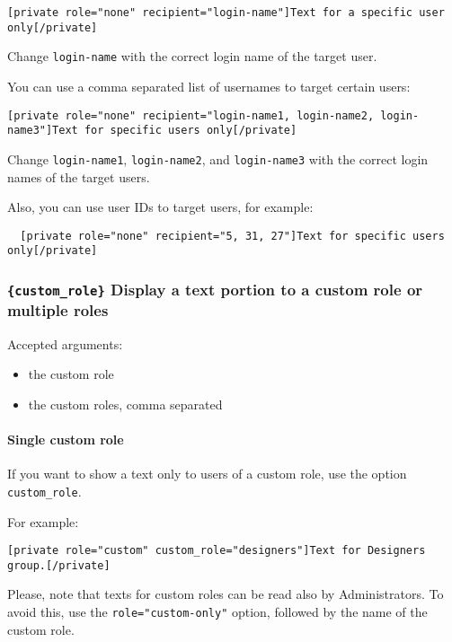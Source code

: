 \begin{lstlisting}
[private role="none" recipient="login-name"]Text for a specific user only[/private]
\end{lstlisting}

Change \verb+login-name+ with the correct login name of the target user.

You can use a comma separated list of usernames to target certain users:

\begin{lstlisting}
[private role="none" recipient="login-name1, login-name2, login-name3"]Text for specific users only[/private]
\end{lstlisting}

Change \verb+login-name1+, \verb+login-name2+, and \verb+login-name3+ with the
correct login names of the target users.

Also, you can use user IDs to target users, for example:

\begin{lstlisting}
  [private role="none" recipient="5, 31, 27"]Text for specific users only[/private]
\end{lstlisting}

\subsubsection{\texttt{\{custom\_role\}} Display a text portion to a custom role or multiple roles}

Accepted arguments:

\begin{itemize}
 \item the custom role
 \item the custom roles, comma separated
\end{itemize}

\paragraph{Single custom role}

If you want to show a text only to users of a custom role, use the option
\verb+custom_role+.

For example:

\begin{lstlisting}
[private role="custom" custom_role="designers"]Text for Designers group.[/private]
\end{lstlisting}


Please, note that texts for custom roles can be read also by Administrators. To
avoid this, use the \verb+role="custom-only"+ option, followed by the name of
the custom role.

